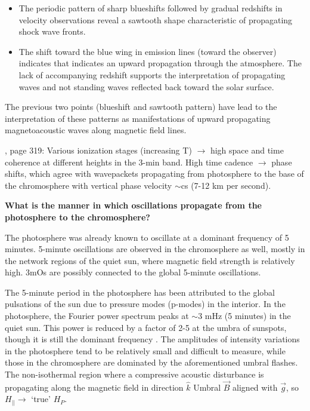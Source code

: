 

\begin{itemize}
    \item The periodic pattern of
        sharp blueshifts followed by gradual redshifts
        in velocity observations reveal a
        sawtooth shape characteristic of propagating shock wave fronts.
    \item The shift toward the blue wing in emission lines (toward the
        observer) indicates that indicates an upward propagation through the
        atmosphere. The lack of accompanying redshift supports the
        interpretation of propagating waves and not standing waves reflected
        back toward the solar surface.
\end{itemize}

The previous two points (blueshift and sawtooth pattern)
have lead to
the interpretation of these patterns as manifestations of upward
propagating magnetoacoustic waves along magnetic field lines.



\cite{Bogdan2006}, page 319:
Various ionization stages (increasing T) $\rightarrow$ high space and time
coherence at different heights in the 3-min band.
High time cadence
$\rightarrow$ phase shifts, which agree with wavepackets propagating from
photosphere to the base of the chromosphere with vertical phase velocity
$\sim$cs (7-12 km per second).



\textbf{What is the manner in which oscillations propagate from the photosphere to
the chromosphere?}

The photosphere was already known to oscillate at a dominant frequency of 5
minutes.
5-minute oscillations are observed in the chromosphere as well, mostly in
the network regions of the quiet sun, where magnetic field strength is
relatively high.
3mOs are possibly connected to the global 5-minute oscillations.

The 5-minute period in the photosphere has been
attributed to the global pulsations of the sun due to pressure modes
(p-modes) in the interior. In the photosphere, the Fourier power spectrum
peaks at $\sim$3 mHz (5 minutes) in the quiet sun.
This power is reduced by a
factor of 2-5 at the umbra of sunspots, though it is still the dominant
frequency \citep{Felipe2010; Bogdan2006 p. 323}.
The amplitudes of intensity variations in the photosphere tend to be relatively
small and difficult to measure, while those in the chromosphere are
dominated by the aforementioned umbral flashes.
The non-isothermal region where a compressive acoustic disturbance is
propagating along the magnetic field in
direction $\hat{k}$
Umbral $\vec{B}$ aligned with $\vec{g}$, so $H_{||} \rightarrow$
`true' $H_{P}$.

